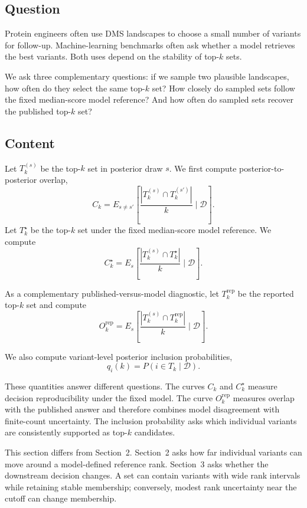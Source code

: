 \documentclass[11pt]{article}
\newcommand{\data}{\mathcal{D}}
\begin{document}
\subsection*{Question}

Protein engineers often use DMS landscapes to choose a small number of variants for follow-up. Machine-learning benchmarks often ask whether a model retrieves the best variants. Both uses depend on the stability of top-$k$ sets.

We ask three complementary questions: if we sample two plausible landscapes, how often do they select the same top-$k$ set? How closely do sampled sets follow the fixed median-score model reference? And how often do sampled sets recover the published top-$k$ set?

\subsection*{Content}

Let $T_k^{(s)}$ be the top-$k$ set in posterior draw $s$. We first compute posterior-to-posterior overlap,
\[
C_k =
E_{s \neq s'}\left[
\frac{|T_k^{(s)} \cap T_k^{(s')}|}{k}
\mid \data
\right].
\]
Let $T_k^\star$ be the top-$k$ set under the fixed median-score model reference. We compute
\[
C_k^\star =
E_s\left[
\frac{|T_k^{(s)} \cap T_k^\star|}{k}
\mid \data
\right].
\]

As a complementary published-versus-model diagnostic, let $T_k^{\mathrm{rep}}$ be the reported top-$k$ set and compute
\[
O_k^{\mathrm{rep}} =
E_s\left[
\frac{|T_k^{(s)} \cap T_k^{\mathrm{rep}}|}{k}
\mid \data
\right].
\]

We also compute variant-level posterior inclusion probabilities,
\[
q_i(k) = P(i \in T_k \mid \data).
\]

These quantities answer different questions. The curves $C_k$ and $C_k^\star$ measure decision reproducibility under the fixed model. The curve $O_k^{\mathrm{rep}}$ measures overlap with the published answer and therefore combines model disagreement with finite-count uncertainty. The inclusion probability asks which individual variants are consistently supported as top-$k$ candidates.

This section differs from Section~2. Section~2 asks how far individual variants can move around a model-defined reference rank. Section~3 asks whether the downstream decision changes. A set can contain variants with wide rank intervals while retaining stable membership; conversely, modest rank uncertainty near the cutoff can change membership.
\end{document}
